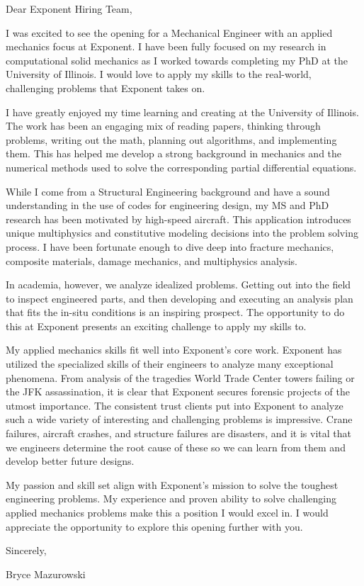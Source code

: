 \documentclass{resume}
\begin{document}
\vspace{0.5in}
Dear Exponent Hiring Team,

I was excited to see the opening for a Mechanical Engineer  with an
applied mechanics focus at Exponent. 
%
I have been fully focused on my research in 
computational solid mechanics as I worked towards
completing my PhD at the University of Illinois.
%
I would love to apply my skills to the real-world,
challenging problems that Exponent takes on.
%

I have greatly enjoyed my time learning and creating at the University
of Illinois.
%
The work has been an engaging mix of reading papers, thinking through
problems, writing out the math, planning out algorithms, and
implementing them.
%
This has helped me develop a strong background in mechanics and the
numerical methods used to solve the corresponding partial differential
equations.
%

While I come from a Structural Engineering background and have a sound
understanding in the use of codes for engineering design, my MS and
PhD research has been motivated by high-speed aircraft.
%
This application introduces unique multiphysics and constitutive modeling
decisions into the problem solving process.
%
I have been fortunate enough to dive deep into fracture mechanics,
composite materials, damage mechanics, and multiphysics analysis.
%

In academia, however, we analyze idealized problems.
%
Getting out into the field to inspect engineered parts, and then
developing and executing an analysis plan that fits the in-situ conditions
is an inspiring prospect.
%
The opportunity to do this at Exponent presents an exciting
challenge to apply my skills to.

My applied mechanics skills fit well into Exponent's core work.
%
Exponent has utilized the specialized skills of their engineers to analyze 
many exceptional phenomena.
%
From analysis of the tragedies World Trade Center towers failing or the JFK
assassination, it is clear that Exponent secures forensic projects of the
utmost importance.
%
The consistent trust clients put into Exponent to analyze
such a wide variety of interesting and challenging problems is
impressive.
%
Crane failures, aircraft crashes, and structure failures are
disasters, and it is vital that we engineers determine the root cause
of these so we can learn from them and develop better future designs.
%

My passion and skill set align with Exponent's mission to solve 
the toughest engineering problems.
%
My experience and proven ability to solve challenging applied
mechanics problems make this a position I would excel in.
%
I would appreciate the opportunity to explore this opening further with you.
%


Sincerely,

Bryce Mazurowski
\end{document}
